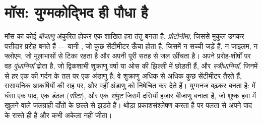\section{मॉस: युग्मकोद्भिद ही पौधा है}

\begin{definition}[मॉस का जीवन-चक्र]\label{def:b2:plant-life-cycles:moss}
मॉस का कोई \emph{बीजाणु} अंकुरित होकर एक शाखित हरा तंतु बनता है,
\emph{प्रोटोनीमा}, जिससे मुकुल उगकर पत्तीदार प्ररोह बनते हैं --- यानी
\emph{}, जो कुछ सेंटीमीटर ऊँचा होता है, जिसमें न सच्ची जड़ें
हैं, न जाइलम, न फ्लोएम, जो मूलाभासों से टिका रहता है और अपनी पूरी सतह से
जल खींचता है। अपने प्ररोह-शीर्षों पर वह \emph{पुंधानियाँ} ढोता है, जो
द्विकशाभी शुक्राणु वर्षा या ओस की झिल्ली में छोड़ती हैं, और
\emph{स्त्रीधानियाँ}, जिनमें से हर एक की गर्दन के तल पर एक अंडाणु है; वे
शुक्राणु अधिक से अधिक कुछ सेंटीमीटर तैरते हैं, रासायनिक आकर्षियों की
राह पर, और वहीं अंडाणु को निषेचित कर देते हैं। युग्मनज बढ़कर
\emph{} बनता है:  में धँसा एक पाद, एक डंठल
(\emph{सीटा}), और एक \emph{संपुट} जिसमें  दसियों हज़ार
बीजाणु बनाता है, जो शुष्क हवा में खुलने वाले जलग्राही दाँतों के छल्ले से
झड़ते हैं।  थोड़ा प्रकाशसंश्लेषण करता है पर पलता
 से अपने पाद के रास्ते ही है और कभी अकेला नहीं जीता।
\end{definition}

